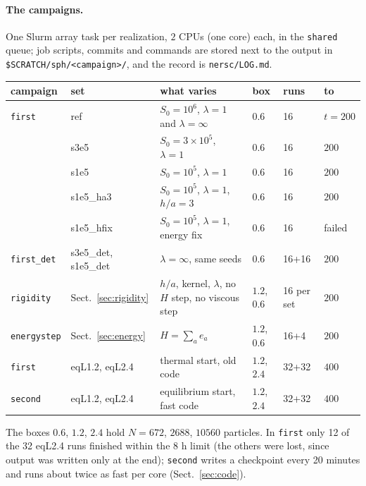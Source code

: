 \documentclass[11pt,aps,preprint,nofootinbib,superscriptaddress,tightenlines]{revtex4-2}
\def\Sect#1{Sect.~\ref{#1}}
\let\oldparagraph\paragraph
\renewcommand{\paragraph}{\par\bigskip\oldparagraph}
\begin{document}
\paragraph{The campaigns.}  One Slurm array task per realization, $2$ CPUs (one core) each,
in the \texttt{shared} queue; job scripts, commits and commands are stored next to the
output in \texttt{\$SCRATCH/sph/<campaign>/}, and the record is \texttt{nersc/LOG.md}.
\begin{center}
\begin{tabular}{llllll}
\hline
campaign & set & what varies & box & runs & to \\ \hline
\texttt{first} & ref & $S_0=10^6$, $\lambda=1$ and $\lambda=\infty$ & $0.6$ & 16 & $t=200$ \\
 & s3e5 & $S_0=3\times10^5$, $\lambda=1$ & $0.6$ & 16 & $200$ \\
 & s1e5 & $S_0=10^5$, $\lambda=1$ & $0.6$ & 16 & $200$ \\
 & s1e5\_ha3 & $S_0=10^5$, $\lambda=1$, $h/a=3$ & $0.6$ & 16 & $200$ \\
 & s1e5\_hfix & $S_0=10^5$, $\lambda=1$, energy fix & $0.6$ & 16 & failed \\
\texttt{first\_det} & s3e5\_det, s1e5\_det & $\lambda=\infty$, same seeds & $0.6$ & 16+16 & $200$ \\
\texttt{rigidity} & \Sect{sec:rigidity} & $h/a$, kernel, $\lambda$, no $H$ step, no viscous step & $1.2$, $0.6$ & 16 per set & $200$ \\
\texttt{energystep} & \Sect{sec:energy} & $H=\sum_ae_a$ & $1.2$, $0.6$ & 16+4 & $200$ \\
\texttt{first} & eqL1.2, eqL2.4 & thermal start, old code & $1.2$, $2.4$ & 32+32 & $400$ \\
\texttt{second} & eqL1.2, eqL2.4 & equilibrium start, fast code & $1.2$, $2.4$ & 32+32 & $400$ \\
\hline
\end{tabular}
\end{center}
The boxes $0.6$, $1.2$, $2.4$ hold $N=672$, $2688$, $10560$ particles.  In
\texttt{first} only 12 of the 32 eqL2.4 runs finished within the 8 h limit (the others
were lost, since output was written only at the end); \texttt{second} writes a
checkpoint every 20 minutes and runs about twice as fast per core (\Sect{sec:code}).
\end{document}
